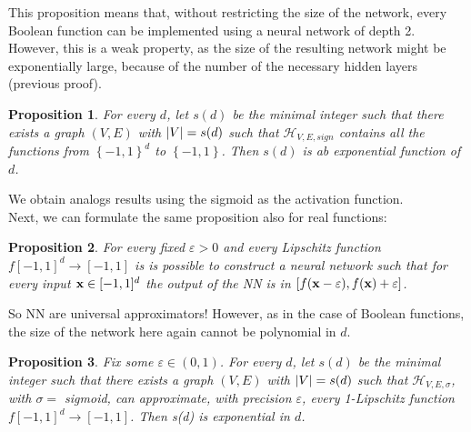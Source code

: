 \documentclass[12pt]{report}
\theoremstyle{plain}
\newtheorem{proposition}{Proposition}[chapter]
\newcommand\mcl[1]{\mathcal{#1}}
\begin{document}
\begin{flushleft}
This proposition means that, without restricting the size of the network, every Boolean function can be implemented using a neural network of depth 2. However, this is a weak property, as the size of the resulting network might be exponentially large, because of the number of the necessary hidden layers (previous proof).
\begin{proposition}
	For every $d$, let $s(d)$ be the minimal integer such that there exists a graph $(V,E)$ with $\abs{V}=s(d)$ such that $\mcl{H}_{V,E,sign}$ contains all the functions from $\left\{-1,1\right\}^d$ to $\left\{-1,1\right\}$. Then $s(d)$ is ab exponential function of $d$.
\end{proposition}
We obtain analogs results using the sigmoid as the activation function.\\
Next, we can formulate the same proposition also for real functions:
\begin{proposition}
	For every fixed $\varepsilon>0$ and every Lipschitz function $f[-1,1]^d\to[-1,1]$ is is possible to construct a neural network such that for every input $\vb{x}\in[-1,1]^d$ the output of the NN is in $[f(\vb{x}-\varepsilon),f(\vb{x})+\varepsilon]$.
\end{proposition}
So NN are universal approximators! However, as in the case of Boolean functions, the size of the network here again cannot be polynomial in $d$.
\begin{proposition}
	Fix some $\varepsilon\in(0,1)$. For every $d$, let $s(d)$ be the minimal integer such that there exists a graph $(V,E)$ with $\abs{V}=s(d)$ such that $\mcl{H}_{V,E,\sigma}$, with $\sigma=$ sigmoid, can approximate, with precision $\varepsilon$, every 1-Lipschitz function $f[-1,1]^d\to[-1,1]$. Then s(d) is exponential in $d$.
\end{proposition}


\end{flushleft}
\end{document}
